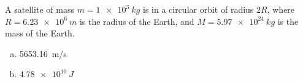 \question A satellite of mass $m=\SI{1e3}{kg}$ is in a circular orbit of radius $2R$, where $R=\SI{6.23e6}{m}$ is the radius of the Earth, and $M=\SI{5.97e24}{kg}$ is the mass of the Earth.
\begin{finalanswer}
\begin{enumerate}[(a)]
\item \SI{5653.16}{m/s}
\item $\SI{4.78e10}{J}$
\end{enumerate}
\end{finalanswer}
